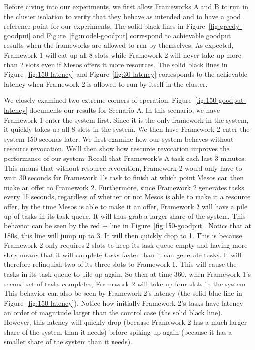 Before diving into our experiments, we first allow Frameworks A and B to run in the cluster isolation to
verify that they behave as intended and to have a good reference point for our experiments. The solid
black lines in Figure~\ref{fig:greedy-goodput} and Figure~\ref{fig:model-goodput} correspond to 
achievable goodput results when the frameworks are allowed to run by themselves. As expected, 
Framework 1 will eat up all 8 slots while Framework 2 will never take up more than 2 slots even if 
Mesos offers it more resources. The solid black lines in Figure~\ref{fig:150-latency} and
Figure~\ref{fig:30-latency} corresponds to the achievable latency when Framework 2 is allowed to run by
itself in the cluster.

We closely examined two extreme corners of operation. Figure~\ref{fig:150-goodput-latency} documents our
results for Scenario A. In this scenario, we have Framework 1 enter the system first. Since it is the 
only framework in the system, it quickly takes up all 8 slots in the system. We then have Framework 2
enter the system 150 seconds later. We first examine how our system behaves without resource revocation.
We'll then show how resource revocation improves the performance of our system. Recall that Framework's
A task each last 3 minutes. This means that without resource revocation, Framework 2 would only have to
wait 30 seconds for Framework 1's task to finish at which point Mesos can then make an offer to 
Framework 2. Furthermore, since Framework 2 generates tasks every 15 seconds, regardless of whether or
not Mesos is able to make it a resource offer, by the time Mesos is able to make it an offer, 
Framework 2 will have a pile up of tasks in its task queue. It will thus grab a larger share of the 
system. This behavior can be seen by the red $+$ line in Figure~\ref{fig:150-goodput}. Notice that at 
180s, this line will jump up to 3. It will then quickly drop to 1. This is because Framework 2 only 
requires 2 slots to keep its task queue empty and having more slots means that it will complete tasks 
faster than it can generate tasks. It will therefore relinquish two of its three slots to Framework 1.
This will cause the tasks in its task queue to pile up again. So then at time 360, when Framework 1's
second set of tasks completes, Framework 2 will take up four slots in the system. This behavior can
also be seen by Framework 2's latency (the solid blue line in Figure~\ref{fig:150-latency}). Notice how
initially Framework 2's tasks have latency an order of magnitude larger than the control case (the
solid black line). However, this latency will quickly drop (because Framework 2 has a much larger share
of the system than it needs) before spiking up again (because it has a smaller share of the system
than it needs).

